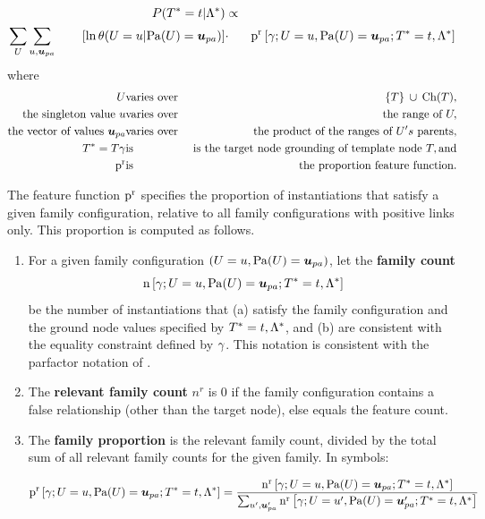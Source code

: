 \documentclass[runningheads,a4paper]{llncs}
\renewcommand{\Qconj}{\Appendterm{\FG{\TT} = \TV} {\QC}} %
\begin{document}
\begin{definition}\label{def:log-diff-freq-eq}
\begin{eqnarray*}
  \Gprob{\FG{{\TT}} = \TV} {\QC} &\propto &  \\
 \sum_{\UT} \sum_{\UV,\Prange{\UT}}   
\qquad \left[ \ln \cprob{\UT = \UV}{\Pa{\UT} = \Prange{\UT}} \right] &
    \cdot &
    \Relfreq{\Appendterm{\grounding;\UT  = \UV} {\Pa{\UT} = \Prange{\UT}}} {\Qconj}
\end{eqnarray*}
where 
\begin{eqnarray*}
\UT &\mathrm{varies\ over} & \Setaddterm{\{\TT\}} {\Ch{\TT}}, \\
\mbox{the singleton value} \ \UV & \mathrm{varies\ over} & \mbox{the range of}\  \UT,\\
\mbox{the vector of values} \ \Prange{\UT} & \mathrm{varies\ over} & \mbox{the product of the ranges of} \ \UT's\ \mbox{parents}, \\
\FG{\TT} = \TT \grounding&\mathrm{is} & \mbox{ is the target node grounding of template node }  \TT, \mathrm{and} \\
\Relevant{\Fvar} &\mathrm{is} & \mbox{the proportion feature function}.
\end{eqnarray*}
\end{definition}

The feature function $\mathrm{p}^{\mathrm{r}}$ specifies the proportion of instantiations that satisfy a given family configuration, relative to all family configurations with positive links only. This proportion is computed as follows. 

\begin{enumerate}
\item For a given family configuration $(\Appendterm{\UT  = \UV} {\Pa{\UT} = \Prange{\UT}})$, let the \textbf{family  count} $$\Count{\Appendterm{\grounding;\UT  = \UV} {\Pa{\UT} = \Prange{\UT}}} {\Qconj}$$ be the number of instantiations that (a) satisfy the family configuration and the ground node values specified by $\Qconj$, and (b) are consistent with the equality constraint defined by $\gamma$. This notation is consistent with the parfactor notation of \cite{Poole2003}. 
\item The \textbf{relevant family count} $n^{r}$ is 0 if the family configuration contains a false relationship (other than the target node), else equals the feature count.
\item The \textbf{family proportion} is the relevant family count, divided by the total sum of all relevant family counts for the given family. In symbols:

\begin{equation} \notag
 \Relfreq{\Appendterm{\grounding;\UT  = \UV} {\Pa{\UT} = \Prange{\UT}}} {\Qconj} = \frac{\Relcount{\Appendterm{\grounding;\UT  = \UV} {\Pa{\UT} = \Prange{\UT}}} {\Qconj}}{\sum_{\UV',\Prange{\UT}'}\Relcount{\Appendterm{\grounding;\UT  = \UV'} {\Pa{\UT} = \Prange{\UT}'}} {\Qconj}}
\end{equation}
\end{enumerate}
\end{document}
